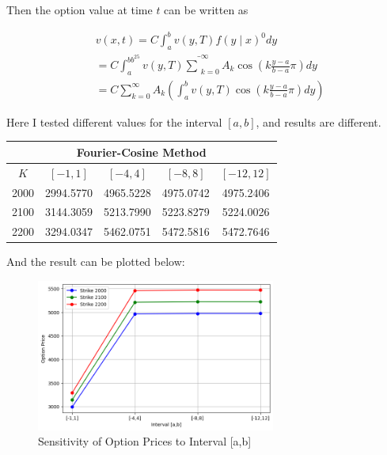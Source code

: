\documentclass[margin=1in]{article}
\begin{document}
	  Then the option value at time $t$ can be written as
	  
	  $$
	  \begin{aligned}
	   & v(x, t)=C \int_{a}^{b} v(y, T) f(y \mid x)^{0} d y \\
	  	& =C \int_{a}^{b b^{25}} v(y, T) \bar{\sum}_{k=0}^{\infty} A_{k} \cos \left(k \frac{y-a}{b-a} \pi\right) d y \\
	  	& =C \sum_{k=0}^{\infty} A_{k}\left(\int_{a}^{b} v(y, T) \cos \left(k \frac{y-a}{b-a} \pi\right) d y\right)
	  \end{aligned}
	  $$
	
	Here I tested different values for the interval $[a,b]$, and results are different. 
	\begin{table}[h!]
		\centering
		\begin{tabular}{|c|c|c|c|c|}
			\hline
			\multicolumn{5}{|c|}{Fourier-Cosine Method} \\
			\hline
			$K$ & $[-1,1]$  & $[-4,4]$ & $[-8,8]$ & $[-12,12]$  \\
			\hline
			2000 &2994.5770 & 4965.5228  & 4975.0742 & 4975.2406\\
			\hline
			2100 & 3144.3059 & 5213.7990 & 5223.8279 & 5224.0026 \\
			\hline
			2200 & 3294.0347 & 5462.0751 & 5472.5816 & 5472.7646 \\
			\hline
		\end{tabular}
	\end{table}

And the result can be plotted below:

\begin{figure}[h]
	\caption{Sensitivity of Option Prices to Interval [a,b]}
	\centering
	\includegraphics[width=0.7\textwidth]{HW1_Q3}
\end{figure}
\end{document}
